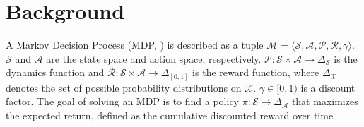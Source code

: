 \section{Background} \label{back}

A Markov Decision Process (MDP, \cite{puterman2014markov}) is described as a tuple $\mathcal{M}=\langle \mathcal{S}, \mathcal{A}, \mathcal{P}, \mathcal{R}, \gamma \rangle$. $\mathcal{S}$ and $\mathcal{A}$ are the state space and action space, respectively. $\mathcal{P}: \mathcal{S} \times \mathcal{A} \rightarrow \Delta_\mathcal{S}$ is the dynamics function and $\mathcal{R}: \mathcal{S} \times \mathcal{A} \rightarrow \Delta_{[0, 1]}$ is the reward function, where $\Delta_\mathcal{X}$ denotes the set of possible probability distributions on $\mathcal{X}$. $\gamma \in [0, 1)$ is a discount factor. The goal of solving an MDP is to find a policy $\pi: \mathcal{S} \rightarrow \Delta_\mathcal{A}$ that maximizes the expected return, defined as the cumulative discounted reward over time. 

